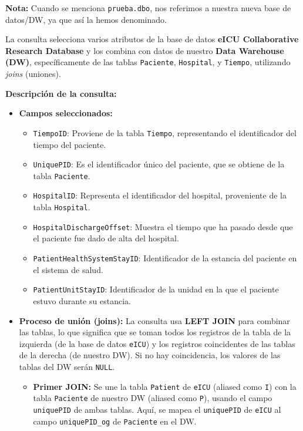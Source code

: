 \documentclass[12pt, a4paper, twoside]{article}
\begin{document}
	\textbf{Nota:} Cuando se menciona \texttt{prueba.dbo}, nos referimos a nuestra nueva base de datos/DW, ya que así la hemos denominado.
	
	La consulta selecciona varios atributos de la base de datos \textbf{eICU Collaborative Research Database} y los combina con datos de nuestro \textbf{Data Warehouse (DW)}, específicamente de las tablas \texttt{Paciente}, \texttt{Hospital}, y \texttt{Tiempo}, utilizando \textit{joins} (uniones).
	
	\textbf{Descripción de la consulta:}
	
	\begin{itemize} \item \textbf{Campos seleccionados:} 
		\begin{itemize} 
			\item \texttt{TiempoID}: Proviene de la tabla \texttt{Tiempo}, representando el identificador del tiempo del paciente. \item \texttt{UniquePID}: Es el identificador único del paciente, que se obtiene de la tabla \texttt{Paciente}. \item \texttt{HospitalID}: Representa el identificador del hospital, proveniente de la tabla \texttt{Hospital}. \item \texttt{HospitalDischargeOffset}: Muestra el tiempo que ha pasado desde que el paciente fue dado de alta del hospital. \item \texttt{PatientHealthSystemStayID}: Identificador de la estancia del paciente en el sistema de salud. \item \texttt{PatientUnitStayID}: Identificador de la unidad en la que el paciente estuvo durante su estancia. 
		\end{itemize}
		
		\item \textbf{Proceso de unión (joins):}
		La consulta usa \textbf{LEFT JOIN} para combinar las tablas, lo que significa que se toman todos los registros de la tabla de la izquierda (de la base de datos \texttt{eICU}) y los registros coincidentes de las tablas de la derecha (de nuestro DW). Si no hay coincidencia, los valores de las tablas del DW serán \texttt{NULL}.
		
		\begin{itemize}
			\item \textbf{Primer JOIN:} Se une la tabla \texttt{Patient} de \texttt{eICU} (aliased como \texttt{I}) con la tabla \texttt{Paciente} de nuestro DW (aliased como \texttt{P}), usando el campo \texttt{uniquePID} de ambas tablas. Aquí, se mapea el \texttt{uniquePID} de \texttt{eICU} al campo \texttt{uniquePID\_og} de \texttt{Paciente} en el DW.
			

\end{itemize}
\end{itemize}
\end{document}
